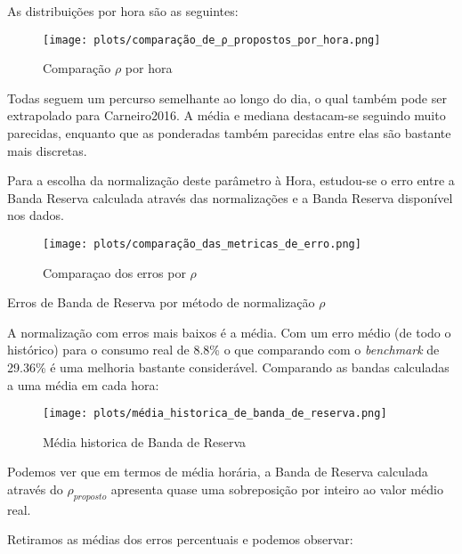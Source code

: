 As distribuições por hora são as seguintes:

\begin{figure}[H]
    \centering
    \texttt{[image: plots/comparação\_de\_ρ\_propostos\_por\_hora.png]}
    \caption{Comparação $\rho$ por hora}
    \label{fig:comparação_de_ρ_propostos_por_hora}
\end{figure}

Todas seguem um percurso semelhante ao longo do dia, o qual também pode ser extrapolado para Carneiro2016. A média e mediana destacam-se seguindo muito parecidas, enquanto que as ponderadas também parecidas entre elas são bastante mais discretas.\par
Para a escolha da normalização deste parâmetro à Hora, estudou-se o erro entre a Banda Reserva calculada através das normalizações e a Banda Reserva disponível nos dados.\par


\begin{figure}[H]
    \centering
    \texttt{[image: plots/comparação\_das\_metricas\_de\_erro.png]}
    \caption{Comparaçao dos erros por $\rho$}
\end{figure}


\begin{table}[H]
    \centering
    \caption{Erros de Banda de Reserva por método de normalização $\rho$}    
    \resizebox{0.65\linewidth}{!}{}
    \end{table}


A normalização com erros mais baixos é a média. Com um erro médio (de todo o histórico) para o consumo real de 8.8\% o que comparando com o \textit{benchmark} de 29.36\% é uma melhoria  bastante considerável. Comparando as bandas calculadas a uma média em cada hora:\par

\begin{figure}[H]
    \centering
    \texttt{[image: plots/média\_historica\_de\_banda\_de\_reserva.png]}
    \caption{Média historica de Banda de Reserva}
\end{figure}

Podemos ver que em termos de média horária, a Banda de Reserva calculada através do $\rho_{proposto}$ apresenta quase uma sobreposição por inteiro ao valor médio real.\par

Retiramos as médias dos erros percentuais e podemos observar: \\

